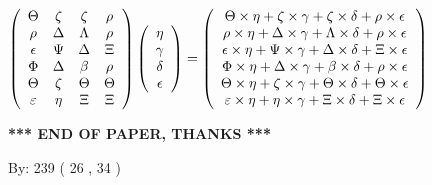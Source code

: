 \documentclass[12pt]{article}
\begin{document}
$  %
 \left( \begin{array}
 {
 c
 c
 c
 c
 }
 \Theta & 
                    \zeta & 
                    \zeta & 
 \rho \\ 
 \rho & 
 \Delta & 
 \Lambda & 
 \rho \\ 
 \epsilon & 
 \Psi & 
 \Delta & 
                    \Xi \\ 
 \Phi & 
 \Delta & 
 \beta & 
 \rho \\ 
 \Theta & 
                    \zeta & 
 \Theta & 
 \Theta \\ 
 \varepsilon & 
 \eta & 
                    \Xi & 
                    \Xi
 \end{array} \right)
 \left( \begin{array}
 {
 c
 }
 \eta \\ 
 \gamma \\ 
 \delta \\ 
 \epsilon
 \end{array} \right)
=
 \left( \begin{array}
 {
 c
 }
  \Theta \times  \eta +                     \zeta \times  \gamma +                     \zeta \times  \delta +  \rho \times  \epsilon \\ 
  \rho \times  \eta +  \Delta \times  \gamma +  \Lambda \times  \delta +  \rho \times  \epsilon \\ 
  \epsilon \times  \eta +  \Psi \times  \gamma +  \Delta \times  \delta +                     \Xi \times  \epsilon \\ 
  \Phi \times  \eta +  \Delta \times  \gamma +  \beta \times  \delta +  \rho \times  \epsilon \\ 
  \Theta \times  \eta +                     \zeta \times  \gamma +  \Theta \times  \delta +  \Theta \times  \epsilon \\ 
  \varepsilon \times  \eta +  \eta \times  \gamma +                     \Xi \times  \delta +                     \Xi \times  \epsilon
 \end{array} \right)
$
 
   
   
   
   
\vspace{1.0in} 
{\textbf{\large{ *** END OF PAPER, THANKS *** }}} 
   
   
\hspace{1.0in} By: 
         239 (          26 ,           34 )
   
   
   
   
\newpage 
\setcounter{page}{ 
    30001 } 
   
\end{document}
